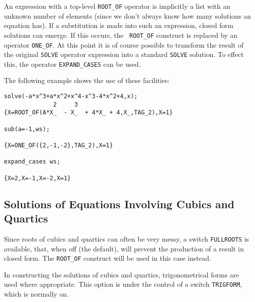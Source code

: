 An expression with a top-level {\tt ROOT\_OF} operator is implicitly a
list with an unknown number of elements (since we don't always know how
many solutions an equation has).  If a substitution is made into such an
expression, closed form solutions can emerge.  If this occurs, the {\tt
ROOT\_OF} construct is replaced by an operator {\tt ONE\_OF}.
At this point it is of course possible to transform the result of the
original {\tt SOLVE} operator expression into a standard {\tt SOLVE}
solution.  To effect this, the operator {\tt EXPAND\_CASES}
 can be used.

The following example shows the use of these facilities:
\extendedmanual{\newpage}
\begin{verbatim}
solve(-a*x^3+a*x^2+x^4-x^3-4*x^2+4,x);
              2     3
{X=ROOT_OF(A*X_  - X_  + 4*X_ + 4,X_,TAG_2),X=1}

sub(a=-1,ws);

{X=ONE_OF({2,-1,-2},TAG_2),X=1}

expand_cases ws;

{X=2,X=-1,X=-2,X=1}
\end{verbatim}

\subsection{Solutions of Equations Involving Cubics and Quartics}

Since roots of cubics and quartics can often be very messy, a switch
{\tt FULLROOTS} is available, that, when off (the
default), will prevent the production of a result in closed form.  The
{\tt ROOT\_OF} construct will be used in this case instead.

In constructing the solutions of cubics and quartics, trigonometrical
forms are used where appropriate.  This option is under the control of a
switch {\tt TRIGFORM}, which is normally on.


